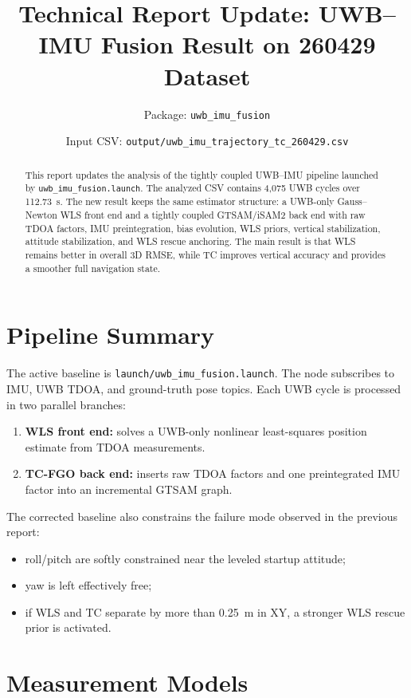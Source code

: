 \documentclass[11pt,a4paper]{article}
\title{Technical Report Update: UWB--IMU Fusion Result on 260429 Dataset}
\author{Package: \texttt{uwb\_imu\_fusion}}
\date{Input CSV: \texttt{output/uwb\_imu\_trajectory\_tc\_260429.csv}}
\begin{document}
\maketitle

\begin{abstract}
This report updates the analysis of the tightly coupled UWB--IMU pipeline launched by \texttt{uwb\_imu\_fusion.launch}. The analyzed CSV contains 4,075 UWB cycles over \SI{112.73}{s}. The new result keeps the same estimator structure: a UWB-only Gauss--Newton WLS front end and a tightly coupled GTSAM/iSAM2 back end with raw TDOA factors, IMU preintegration, bias evolution, WLS priors, vertical stabilization, attitude stabilization, and WLS rescue anchoring. The main result is that WLS remains better in overall 3D RMSE, while TC improves vertical accuracy and provides a smoother full navigation state.
\end{abstract}

\section{Pipeline Summary}

The active baseline is \texttt{launch/uwb\_imu\_fusion.launch}. The node subscribes to IMU, UWB TDOA, and ground-truth pose topics. Each UWB cycle is processed in two parallel branches:

\begin{enumerate}[leftmargin=*]
  \item \textbf{WLS front end:} solves a UWB-only nonlinear least-squares position estimate from TDOA measurements.
  \item \textbf{TC-FGO back end:} inserts raw TDOA factors and one preintegrated IMU factor into an incremental GTSAM graph.
\end{enumerate}

The corrected baseline also constrains the failure mode observed in the previous report:

\begin{itemize}[leftmargin=*]
  \item roll/pitch are softly constrained near the leveled startup attitude;
  \item yaw is left effectively free;
  \item if WLS and TC separate by more than \SI{0.25}{m} in XY, a stronger WLS rescue prior is activated.
\end{itemize}

\section{Measurement Models}
\end{document}
